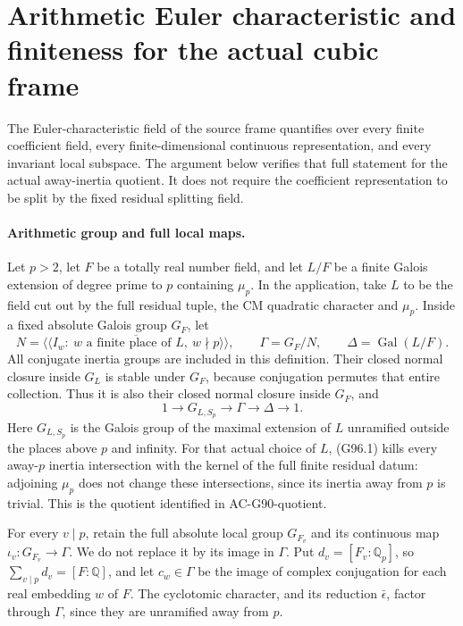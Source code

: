 \section{Arithmetic Euler characteristic and finiteness for the actual cubic frame}
\label{sec:cubic-arithmetic-euler-phi}

The Euler-characteristic field of the source frame quantifies over
every finite coefficient field, every finite-dimensional continuous
representation, and every invariant local subspace.  The argument
below verifies that full statement for the actual away-inertia
quotient.  It does not require the coefficient representation to be
split by the fixed residual splitting field.

\paragraph{Arithmetic group and full local maps.}
Let \(p>2\), let \(F\) be a totally real number field, and let
\(L/F\) be a finite Galois extension of degree prime to \(p\)
containing \(\mu_p\).  In the application, take \(L\) to be the
field cut out by the full residual tuple, the CM quadratic
character and \(\mu_p\).  Inside a fixed
absolute Galois group \(G_F\), let
\[
 N=\overline{\langle\!\langle
       I_w:\ w\text{ a finite place of }L,\ w\nmid p
       \rangle\!\rangle},\qquad
 \Gamma=G_F/N,\qquad \Delta=\operatorname{Gal}(L/F).
 \tag{G96.1}
\]
All conjugate inertia groups are included in this definition.
Their closed normal closure inside \(G_L\) is stable under \(G_F\),
because conjugation permutes that entire collection.  Thus it is
also their closed normal closure inside \(G_F\), and
\[
 1\longrightarrow G_{L,S_p}\longrightarrow\Gamma
   \longrightarrow\Delta\longrightarrow1.
 \tag{G96.2}
\]
Here \(G_{L,S_p}\) is the Galois group of the maximal extension
of \(L\) unramified outside the places above \(p\) and infinity.
For that actual choice of \(L\), (G96.1) kills every away-\(p\)
inertia intersection with the kernel of the full finite residual
datum: adjoining \(\mu_p\) does not change these intersections,
since its inertia away from \(p\) is trivial.  This is the
quotient identified in AC-G90-quotient.

For every \(v\mid p\), retain the full absolute local group
\(G_{F_v}\) and its continuous map
\(\iota_v:G_{F_v}\to\Gamma\).  We do not replace it by its image
in \(\Gamma\).  Put \(d_v=[F_v:\mathbb Q_p]\), so
\(\sum_{v\mid p}d_v=[F:\mathbb Q]\), and let \(c_w\in\Gamma\)
be the image of complex conjugation for each real embedding
\(w\) of \(F\).  The cyclotomic character, and its reduction
\(\bar\epsilon\), factor through \(\Gamma\), since they are
unramified away from \(p\).

